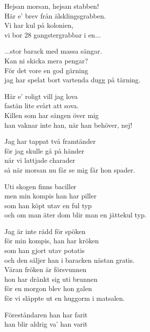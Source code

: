\vspace{10pt}
Hejsan morsan, hejsan stabben!\\
Här e' brev från älsklingsgrabben.\\
Vi har kul på kolonien,\\
vi bor 28 gangstergrabbar i en...\par
\vspace{10pt}
...stor barack med massa sängar.\\
Kan ni skicka mera pengar?\\
För det vore en god gärning\\
jag har spelat bort vartenda dugg på tärning.\par
\vspace{10pt}
Här e' roligt vill jag lova\\
fastän lite svårt att sova.\\
Killen som har sängen över mig\\
han vaknar inte han, när han behöver, nej!\par
\vspace{10pt}
Jag har tappat två framtänder\\
för jag skulle gå på händer\\
när vi lattjade charader\\
så när morsan nu får se mig får hon spader.\par
\vspace{10pt}
Uti skogen finns baciller\\
men min kompis han har piller\\
som han köpt utav en ful typ\\
och om man äter dom blir man en jättekul typ.\par
\vspace{10pt}
Jag är inte rädd för spöken\\
för min kompis, han har kröken\\
som han gjort utav potatis\\
och den säljer han i baracken nästan gratis.\\
Våran fröken är försvunnen\\
hon har dränkt sig uti brunnen\\
för en morgon blev hon galen\\
för vi släppte ut en huggorm i matsalen.\par
\vspace{10pt}
Föreståndaren han har farit\\
han blir aldrig va' han varit\\

